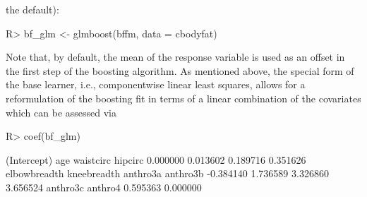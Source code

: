 \documentclass{article}
\newenvironment{Schunk}{}{}
\begin{document}
the default): 
\begin{Schunk}
\begin{Sinput}
R> bf_glm <- glmboost(bffm, data = cbodyfat)
\end{Sinput}
\end{Schunk}
Note that, by default, the mean of the response variable is used as an
offset in the  
first step of the boosting algorithm.
As mentioned above, the special form of the base learner,
i.e., componentwise linear least squares, 
allows for a reformulation of the boosting fit in terms of a linear combination
of the covariates which can be assessed via
\begin{Schunk}
\begin{Sinput}
R> coef(bf_glm)
\end{Sinput}
\begin{Soutput}
 (Intercept)          age    waistcirc      hipcirc 
    0.000000     0.013602     0.189716     0.351626 
elbowbreadth  kneebreadth     anthro3a     anthro3b 
   -0.384140     1.736589     3.326860     3.656524 
    anthro3c      anthro4 
    0.595363     0.000000 
\end{Soutput}
\end{Schunk}
\end{document}
